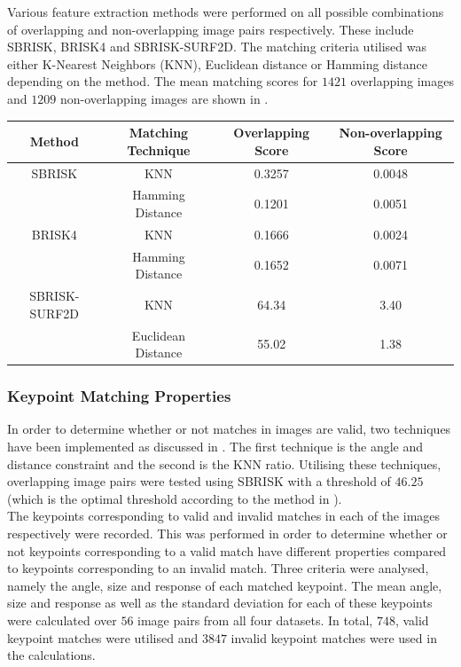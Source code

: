 \documentclass{article}
\begin{document}
Various feature extraction methods were performed on all possible combinations of overlapping and non-overlapping image pairs respectively. These include SBRISK, BRISK4 and SBRISK-SURF2D. The matching criteria utilised was either K-Nearest Neighbors (KNN), Euclidean distance or Hamming distance depending on the method. The mean matching scores for $1421$ overlapping images and $1209$ non-overlapping images are shown in .

\begin{table}
\begin{tabular}{|c|c|c|c|}
\hline 
Method & Matching Technique & Overlapping Score & Non-overlapping Score\tabularnewline
\hline 
\hline 
SBRISK & KNN & 0.3257 & 0.0048\tabularnewline
\hline 
 & Hamming Distance & 0.1201 & 0.0051\tabularnewline
\hline 
BRISK4 & KNN & 0.1666 & 0.0024\tabularnewline
\hline 
 & Hamming Distance & 0.1652 & 0.0071\tabularnewline
\hline 
SBRISK- SURF2D & KNN & 64.34 & 3.40\tabularnewline
\hline 
 & Euclidean Distance & 55.02 & 1.38\tabularnewline
\hline 
\end{tabular}
\label{tab:matchingScoreCompare}
\end{table}

\subsubsection{Keypoint Matching Properties}
\label{sec:keypointMatching}
In order to determine whether or not matches in images are valid, two techniques have been implemented as discussed in . The first technique is the angle and distance constraint and the second is the KNN ratio. Utilising these techniques, overlapping image pairs were tested using SBRISK with a threshold of $46.25$ (which is the optimal threshold according to the method in ).\\

The keypoints corresponding to valid and invalid matches in each of the images respectively were recorded. This was performed in order to determine whether or not keypoints corresponding to a valid match have different properties compared to keypoints corresponding to an invalid match. Three criteria were analysed, namely the angle, size and response of each matched keypoint. The mean angle, size and response as well as the standard deviation for each of these keypoints were calculated over $56$ image pairs from all four datasets. In total, $748$, valid keypoint matches were utilised and $3847$ invalid keypoint matches were used in the calculations.\\
\end{document}
